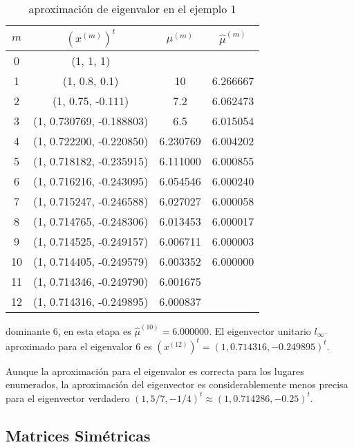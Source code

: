 \documentclass[12pt, a4paper]{article}
\numberwithin{subsection}{section} %
\begin{document}
            \begin{table}[h!]
                \centering
                \caption{aproximación de eigenvalor en el ejemplo 1}
                \label{tab:ej1}
                \begin{tabular}{|cccc|} \hline
                    $m$ & $(x^{(m)})^t$ & $\mu^{(m)}$ & $\hat{\mu}^{(m)}$ \\ \hline
                    0  &  (1, 1, 1)  & & \\
                    1  &  (1, 0.8, 0.1)  &  10 & 6.266667 \\
                    2  &  (1, 0.75, -0.111)  &  7.2 & 6.062473 \\
                    3  &  (1, 0.730769, -0.188803)  &  6.5 & 6.015054 \\
                    4  &  (1, 0.722200, -0.220850)  &  6.230769 & 6.004202 \\
                    5  &  (1, 0.718182, -0.235915)  &  6.111000 & 6.000855  \\
                    6  &  (1, 0.716216, -0.243095)  &  6.054546 & 6.000240 \\
                    7  &  (1, 0.715247, -0.246588)  &  6.027027 & 6.000058  \\
                    8  &  (1, 0.714765, -0.248306)  &  6.013453 & 6.000017  \\
                    9  &  (1, 0.714525, -0.249157)  &  6.006711 & 6.000003  \\
                    10  &  (1, 0.714405, -0.249579)  &  6.003352 & 6.000000 \\
                    11  &  (1, 0.714346, -0.249790)  &  6.001675 & \\
                    12  &  (1, 0.714316, -0.249895)  &  6.000837 & \\ \hline
                \end{tabular}
            \end{table}
        
            dominante 6, en esta etapa es $\hat{\mu}^{(10)} = 6.000000$. El eigenvector unitario $l_{\infty^-}$ aproximado para el eigenvalor 6 es $(x^{(12)})^t = (1, 0.714316,-0.249895)^t.$
            
            Aunque la aproximación para el eigenvalor es correcta para los lugares enumerados, la aproximación del eigenvector es considerablemente menos precisa para el eigenvector verdadero $(1, 5/7, -1/4)^t  \approx (1, 0.714286, -0.25)^t.$
        
        \subsection{\textnormal{Matrices Simétricas}}
        
\end{document}
